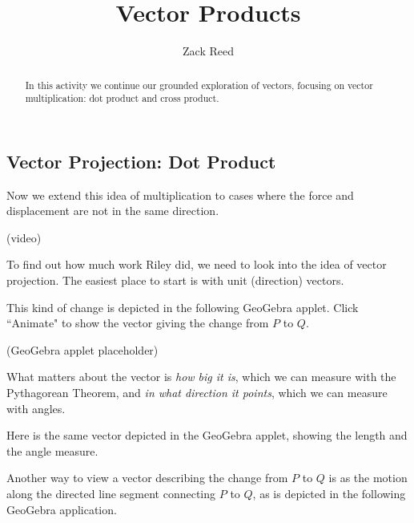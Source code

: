 \documentclass{ximera}
\title{Vector Products}
\author{Zack Reed}
\begin{document}
\begin{abstract}
In this activity we continue our grounded exploration of vectors, focusing on vector multiplication: dot product and cross product.
\end{abstract}
\maketitle


\subsection*{Vector Projection: Dot Product}

Now we extend this idea of multiplication to cases where the force and displacement are not in the same direction.

(video)

To find out how much work Riley did, we need to look into the idea of vector projection. The easiest place to start is with unit (direction) vectors.


This kind of change is depicted in the following GeoGebra applet. Click ``Animate" to show the vector giving the change from $P$ to $Q$.

(GeoGebra applet placeholder)

What matters about the vector is \emph{how big it is}, which we can measure with the Pythagorean Theorem, and \emph{in what direction it points}, which we can measure with angles.

Here is the same vector depicted in the GeoGebra applet, showing the length and the angle measure. 

\begin{center}
\end{center}

Another way to view a vector describing the change from $P$ to $Q$ is as the motion along the directed line segment connecting $P$ to $Q$, as is depicted in the following GeoGebra application.

\begin{center}
\end{center}
\end{document}
